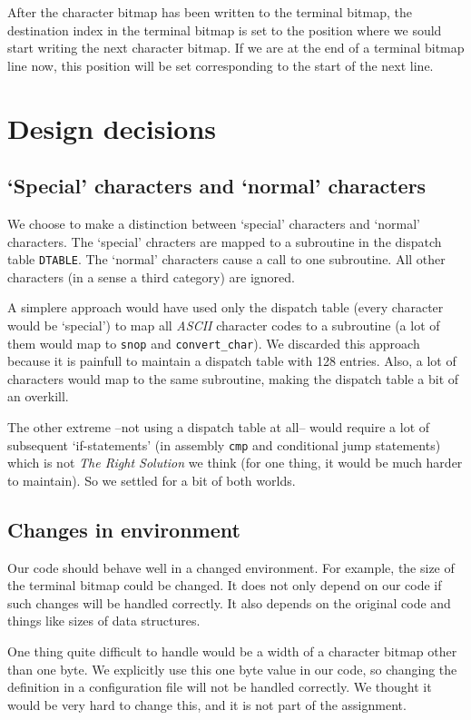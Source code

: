 \documentclass[11pt]{article}
\begin{document}
After the character bitmap has been written to the terminal bitmap, the destination index in the terminal bitmap is set to the position where we sould start writing the next character bitmap. If we are at the end of a terminal bitmap line now, this position will be set corresponding to the start of the next line.


\section{Design decisions}

\subsection{`Special' characters and `normal' characters}

We choose to make a distinction between `special' characters and `normal' characters. The `special' chracters are mapped to a subroutine in the dispatch table \verb|DTABLE|. The `normal' characters cause a call to one subroutine. All other characters (in a sense a third category) are ignored.

A simplere approach would have used only the dispatch table (every character would be `special') to map all \emph{ASCII} character codes to a subroutine (a lot of them would map to \verb|snop| and \verb|convert_char|). We discarded this approach because it is painfull to maintain a dispatch table with 128 entries. Also, a lot of characters would map to the same subroutine, making the dispatch table a bit of an overkill.

The other extreme --not using a dispatch table at all-- would require a lot of subsequent `if-statements' (in assembly \verb|cmp| and conditional jump statements) which is not \emph{The Right Solution} we think (for one thing, it would be much harder to maintain). So we settled for a bit of both worlds.

\subsection{Changes in environment}

Our code should behave well in a changed environment. For example, the size of the terminal bitmap could be changed. It does not only depend on our code if such changes will be handled correctly. It also depends on the original code and things like sizes of data structures.

One thing quite difficult to handle would be a width of a character bitmap other than one byte. We explicitly use this one byte value in our code, so changing the definition in a configuration file will not be handled correctly. We thought it would be very hard to change this, and it is not part of the assignment.
\end{document}
